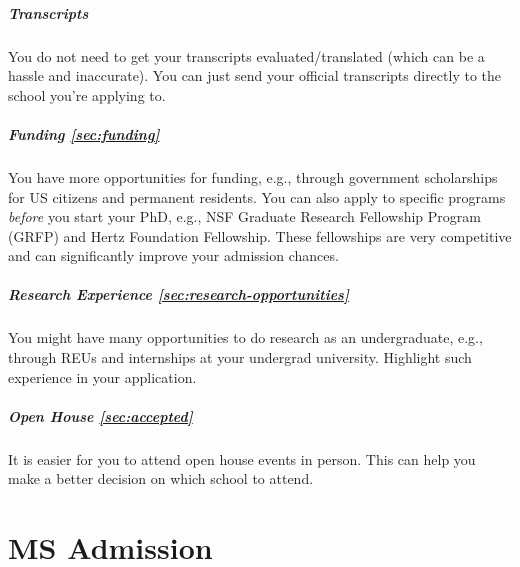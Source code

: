 \documentclass[oneside,11pt,dvipsnames]{book}
\newenvironment{domesticbox}[1][]{
  \small
  \begin{mydomesticbox}
    {\small \textbf{#1}}
  }{
  \end{mydomesticbox}
}
\def\chapterinfo#1{%
  \addcontentsline{toc}{chapterinfo}{%
    \noexpand\numberline{}\color{black}{#1}}%
}
\begin{document}
\paragraph{Transcripts} You do not need to get your transcripts evaluated/translated (which can be a hassle and inaccurate).  You can just send your official transcripts directly to the school you're applying to.

\paragraph{Funding \autoref{sec:funding}} You have more opportunities for funding, e.g., through government scholarships for US citizens and permanent residents.  You can also apply to specific programs \emph{before} you start your PhD, e.g., NSF Graduate Research Fellowship Program (GRFP) and Hertz Foundation Fellowship.  These fellowships are very competitive and can significantly improve your admission chances.

\paragraph{Research Experience \autoref{sec:research-opportunities}} You might have many opportunities to do research as an undergraduate, e.g., through REUs and internships at your undergrad university.  Highlight such experience in your application.

\paragraph{Open House \autoref{sec:accepted}} It is easier for you to attend open house events in person.  This can help you make a better decision on which school to attend.


\chapter{MS Admission}
\chapterinfo{MS focuses on coursework and prepares you for industry, while PhD focuses on research and prepares you for academia or research.}
\end{document}
